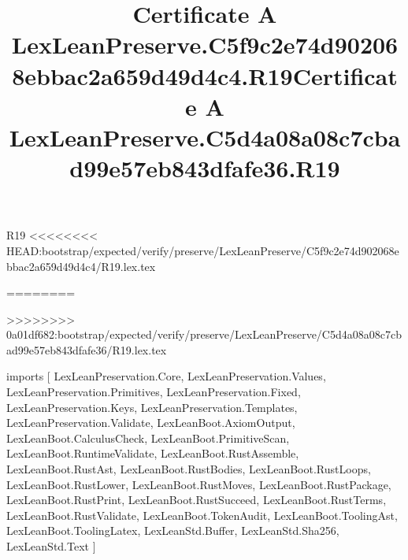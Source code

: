 \begin{lexlean}{R19}
<<<<<<<< HEAD:bootstrap/expected/verify/preserve/LexLeanPreserve/C5f9c2e74d902068ebbac2a659d49d4c4/R19.lex.tex
\title{Certificate A LexLeanPreserve.C5f9c2e74d902068ebbac2a659d49d4c4.R19}
========
\title{Certificate A LexLeanPreserve.C5d4a08a08c7cbad99e57eb843dfafe36.R19}
>>>>>>>> 0a01df682:bootstrap/expected/verify/preserve/LexLeanPreserve/C5d4a08a08c7cbad99e57eb843dfafe36/R19.lex.tex
\begin{coremodule}
imports [
  LexLeanPreservation.Core,
  LexLeanPreservation.Values,
  LexLeanPreservation.Primitives,
  LexLeanPreservation.Fixed,
  LexLeanPreservation.Keys,
  LexLeanPreservation.Templates,
  LexLeanPreservation.Validate,
  LexLeanBoot.AxiomOutput,
  LexLeanBoot.CalculusCheck,
  LexLeanBoot.PrimitiveScan,
  LexLeanBoot.RuntimeValidate,
  LexLeanBoot.RustAssemble,
  LexLeanBoot.RustAst,
  LexLeanBoot.RustBodies,
  LexLeanBoot.RustLoops,
  LexLeanBoot.RustLower,
  LexLeanBoot.RustMoves,
  LexLeanBoot.RustPackage,
  LexLeanBoot.RustPrint,
  LexLeanBoot.RustSucceed,
  LexLeanBoot.RustTerms,
  LexLeanBoot.RustValidate,
  LexLeanBoot.TokenAudit,
  LexLeanBoot.ToolingAst,
  LexLeanBoot.ToolingLatex,
  LexLeanStd.Buffer,
  LexLeanStd.Sha256,
  LexLeanStd.Text
]


\end{coremodule}
\end{lexlean}

